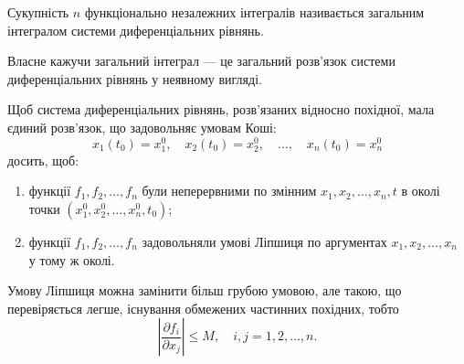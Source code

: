 \begin{definition}
	Сукупність $n$ функціонально незалежних інтегралів називається загальним інтегралом системи диференціальних рівнянь.
\end{definition}

Власне кажучи загальний інтеграл --- це загальний роз\-в'яз\-ок системи диференціальних рівнянь у неявному вигляді.

\begin{theorem}
	Щоб система диференціальних рівнянь, розв'язаних відносно похідної, мала єдиний роз\-в'яз\-ок, що задовольняє умовам Коші: 
	\begin{equation*}
		x_1(t_0) = x_1^0, \quad x_2(t_0) = x_2^0, \quad \ldots, \quad x_n(t_0) = x_n^0
	\end{equation*}
	досить, щоб:
	\begin{enumerate}
		\item функції $f_1, f_2, \ldots, f_n$ були неперервними по змінним $x_1, x_2, \ldots, x_n, t$ в околі точки $\left(x_1^0, x_2^0, \ldots, x_n^0, t_0\right)$;
		\item функції $f_1, f_2, \ldots, f_n$ задовольняли умові Ліпшиця по аргументах $x_1, x_2, \ldots, x_n$ у тому ж околі.
	\end{enumerate}
\end{theorem}

\begin{remark}
	Умову Ліпшиця можна замінити більш грубою умовою, але такою, що перевіряється легше, існування обмежених частинних похідних, тобто 
	\begin{equation*}
		\left| \frac{\partial f_i}{\partial x_j} \right| \le M, \quad i,j = 1, 2, \ldots, n.
	\end{equation*}
\end{remark}